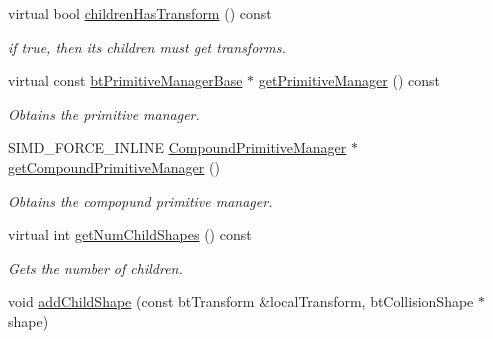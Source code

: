 \begin{CompactItemize}
\item 
\hypertarget{classbt_g_impact_compound_shape_ba1553b4463a14eb56a6d5cdccca4ead}{
virtual bool \hyperlink{classbt_g_impact_compound_shape_ba1553b4463a14eb56a6d5cdccca4ead}{childrenHasTransform} () const }
\label{classbt_g_impact_compound_shape_ba1553b4463a14eb56a6d5cdccca4ead}

\begin{CompactList}\small\item\em if true, then its children must get transforms. \item\end{CompactList}\item 
\hypertarget{classbt_g_impact_compound_shape_56d7a7369cd905893fa61a766c6ae2f5}{
virtual const \hyperlink{classbt_primitive_manager_base}{btPrimitiveManagerBase} $\ast$ \hyperlink{classbt_g_impact_compound_shape_56d7a7369cd905893fa61a766c6ae2f5}{getPrimitiveManager} () const }
\label{classbt_g_impact_compound_shape_56d7a7369cd905893fa61a766c6ae2f5}

\begin{CompactList}\small\item\em Obtains the primitive manager. \item\end{CompactList}\item 
\hypertarget{classbt_g_impact_compound_shape_5608f37c18454c3e82504120e053f67a}{
SIMD\_\-FORCE\_\-INLINE \hyperlink{classbt_g_impact_compound_shape_1_1_compound_primitive_manager}{CompoundPrimitiveManager} $\ast$ \hyperlink{classbt_g_impact_compound_shape_5608f37c18454c3e82504120e053f67a}{getCompoundPrimitiveManager} ()}
\label{classbt_g_impact_compound_shape_5608f37c18454c3e82504120e053f67a}

\begin{CompactList}\small\item\em Obtains the compopund primitive manager. \item\end{CompactList}\item 
\hypertarget{classbt_g_impact_compound_shape_1e48017b7d2f2cf2498606e2084c01e1}{
virtual int \hyperlink{classbt_g_impact_compound_shape_1e48017b7d2f2cf2498606e2084c01e1}{getNumChildShapes} () const }
\label{classbt_g_impact_compound_shape_1e48017b7d2f2cf2498606e2084c01e1}

\begin{CompactList}\small\item\em Gets the number of children. \item\end{CompactList}\item 
\hypertarget{classbt_g_impact_compound_shape_3c97aab1f6511033df73007096ed4c8a}{
void \hyperlink{classbt_g_impact_compound_shape_3c97aab1f6511033df73007096ed4c8a}{addChildShape} (const btTransform \&localTransform, btCollisionShape $\ast$shape)}
\label{classbt_g_impact_compound_shape_3c97aab1f6511033df73007096ed4c8a}


\end{CompactItemize}
